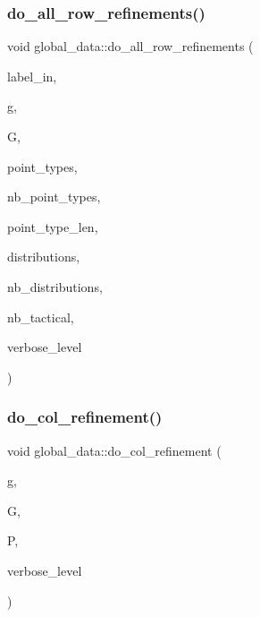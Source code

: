 \subsubsection{\texorpdfstring{do\+\_\+all\+\_\+row\+\_\+refinements()}{do\_all\_row\_refinements()}}
{\footnotesize\ttfamily void global\+\_\+data\+::do\+\_\+all\+\_\+row\+\_\+refinements (\begin{DoxyParamCaption}\item[{\mbox{\hyperlink{galois_8h_ab6cc7b4aeb6ea31aba2b3fbfc83ff5e6}{B\+Y\+TE}} $\ast$}]{label\+\_\+in,  }\item[{ofstream \&}]{g,  }\item[{\mbox{\hyperlink{classtdo__scheme}{tdo\+\_\+scheme}} \&}]{G,  }\item[{\mbox{\hyperlink{galois_8h_a09fddde158a3a20bd2dcadb609de11dc}{I\+NT}} $\ast$}]{point\+\_\+types,  }\item[{\mbox{\hyperlink{galois_8h_a09fddde158a3a20bd2dcadb609de11dc}{I\+NT}}}]{nb\+\_\+point\+\_\+types,  }\item[{\mbox{\hyperlink{galois_8h_a09fddde158a3a20bd2dcadb609de11dc}{I\+NT}}}]{point\+\_\+type\+\_\+len,  }\item[{\mbox{\hyperlink{galois_8h_a09fddde158a3a20bd2dcadb609de11dc}{I\+NT}} $\ast$}]{distributions,  }\item[{\mbox{\hyperlink{galois_8h_a09fddde158a3a20bd2dcadb609de11dc}{I\+NT}}}]{nb\+\_\+distributions,  }\item[{\mbox{\hyperlink{galois_8h_a09fddde158a3a20bd2dcadb609de11dc}{I\+NT}} \&}]{nb\+\_\+tactical,  }\item[{\mbox{\hyperlink{galois_8h_a09fddde158a3a20bd2dcadb609de11dc}{I\+NT}}}]{verbose\+\_\+level }\end{DoxyParamCaption})}

\mbox{\label{classglobal__data_a4709794d5bd963b69a2fbdb0f4f69f95}} 
\subsubsection{\texorpdfstring{do\+\_\+col\+\_\+refinement()}{do\_col\_refinement()}}
{\footnotesize\ttfamily void global\+\_\+data\+::do\+\_\+col\+\_\+refinement (\begin{DoxyParamCaption}\item[{ofstream \&}]{g,  }\item[{\mbox{\hyperlink{classtdo__scheme}{tdo\+\_\+scheme}} \&}]{G,  }\item[{\mbox{\hyperlink{classpartitionstack}{partitionstack}} \&}]{P,  }\item[{\mbox{\hyperlink{galois_8h_a09fddde158a3a20bd2dcadb609de11dc}{I\+NT}}}]{verbose\+\_\+level }\end{DoxyParamCaption})}

